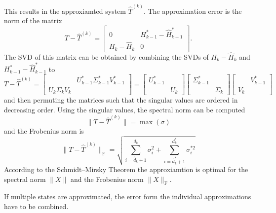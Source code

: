 \documentclass[doctype=mastersthesis,BCOR=15mm,biblatex]{ldvbook}%
\newcommand{\R}{\mathcal{R}} %
\newcommand{\Ob}{\mathcal{O}} %
\begin{document}
This results in the approxiamted system $\hat{T}^{(k)}$.
The approximation error is the norm of the matrix
\begin{equation}
	T-\hat{T}^{(k)} = 
	\begin{bmatrix}
	0&H^*_{k-1}-\hat{H}^*_{k-1}\\
	H_k-\hat{H}_k&0
	\end{bmatrix}.
\end{equation}
The SVD of this matrix can be obtained by combining the SVDs of $H_k-\hat{H}_k$ and $H^*_{k-1}-\hat{H}^*_{k-1}$ to
\begin{equation}
T-\hat{T}^{(k)}=
	\begin{bmatrix}
	 & U_{k-1}^*\Sigma_{k-1}^* V_{k-1}^*\\
	 U_k\Sigma_k V_k
	\end{bmatrix}
	=
	\begin{bmatrix}
	U_{k-1}^*\\
	&U_k
	\end{bmatrix}
	\begin{bmatrix}
\Sigma_{k-1}^*\\
&\Sigma_{k}
\end{bmatrix}
	\begin{bmatrix}
&V_{k-1}^*\\
V_{k}
\end{bmatrix}
\end{equation}
and then permuting the matrices such that the singular values are ordered in decreasing order.
Using the singular values, the spectral norm can be computed 
\begin{equation}\label{eq:bound_single}
	\|T-\hat{T}^{(k)}\| = \max(\sigma)
\end{equation}
and the Frobenius norm is
\begin{equation}
	\|T-\hat{T}^{(k)}\|_\text{F} = \sqrt{\sum_{i=\hat{d}_k+1}^{d_k}\sigma_i^2
	+\sum_{i=\hat{d}_k^*+1}^{d_k^*}\sigma_i^{*2}}
\end{equation}
According to the Schmidt–Mirsky Theorem \cite{bai_matrix_2021} the approxiamtion is optimal for the spectral norm $\|X\|$ and the Frobenius norm $\|X\|_\text{F}$.

If multiple states are approximated, the error form the individual approximations have to be combined.
\end{document}
